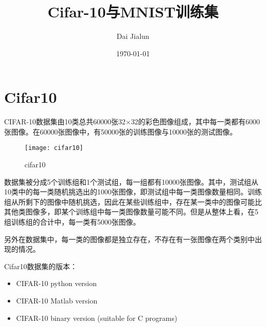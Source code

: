 

\title{\vspace{-2em} Cifar-10与MNIST训练集\\
\normalsize{}}
\author{Dai Jialun}
\date{\vspace{-0.7em} \today \vspace{-0.7em}}
\maketitle\thispagestyle{fancy}
\maketitle
\section{Cifar10}
CIFAR-10数据集由10类总共60000张32$\times$32的彩色图像组成，其中每一类都有6000张图像。在60000张图像中，有50000张的训练图像与10000张的测试图像。

\begin{figure}[!ht]
\centering
\texttt{[image: cifar10]}
\caption{cifar10}
\end{figure}

数据集被分成5个训练组和1个测试组，每一组都有10000张图像。其中，测试组从10类中的每一类随机挑选出的1000张图像，即测试组中每一类图像数量相同。训练组从所剩下的图像中随机挑选，因此在某些训练组中，存在某一类中的图像可能比其他类图像多，即某个训练组中每一类图像数量可能不同。但是从整体上看，在5组训练组的合计中，每一类有5000张图像。

另外在数据集中，每一类的图像都是独立存在，不存在有一张图像在两个类别中出现的情况。

Cifar10数据集的版本：
\begin{itemize}
\item CIFAR-10 python version
\item CIFAR-10 Matlab version
\item CIFAR-10 binary version (suitable for C programs)
\end{itemize}

